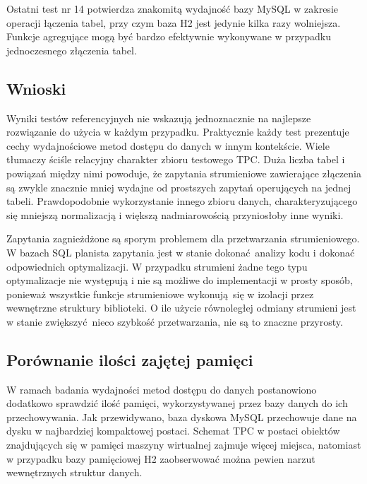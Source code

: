 \documentclass[12pt,twoside,openright]{extarticle}
\begin{document}
    Ostatni test nr 14 potwierdza znakomitą wydajność bazy MySQL w zakresie operacji łączenia tabel, przy czym baza H2 jest jedynie kilka razy wolniejsza. Funkcje agregujące mogą być bardzo efektywnie wykonywane w przypadku jednoczesnego złączenia tabel.

\subsection{Wnioski}

    Wyniki testów referencyjnych nie wskazują jednoznacznie na najlepsze rozwiązanie do użycia w każdym przypadku. Praktycznie każdy test prezentuje cechy wydajnościowe metod dostępu do danych w innym kontekście. Wiele tłumaczy ściśle relacyjny charakter zbioru testowego TPC. Duża liczba tabel i powiązań między nimi powoduje, że zapytania strumieniowe zawierające złączenia są zwykle znacznie mniej wydajne od prostszych zapytań operujących na jednej tabeli. Prawdopodobnie wykorzystanie innego zbioru danych, charakteryzującego się mniejszą normalizacją i większą nadmiarowością przyniosłoby inne wyniki. 

    Zapytania zagnieżdżone są sporym problemem dla przetwarzania strumieniowego. W bazach SQL planista zapytania jest w stanie dokonać analizy kodu i dokonać odpowiednich optymalizacji. W przypadku strumieni żadne tego typu optymalizacje nie występują i nie są możliwe do implementacji w prosty sposób, ponieważ wszystkie funkcje strumieniowe wykonują się w izolacji przez wewnętrzne struktury biblioteki. O ile użycie równoległej odmiany strumieni jest w stanie zwiększyć nieco szybkość przetwarzania, nie są to znaczne przyrosty.


\subsection{Porównanie ilości zajętej pamięci}

    W ramach badania wydajności metod dostępu do danych postanowiono dodatkowo sprawdzić ilość pamięci, wykorzystywanej przez bazy danych do ich przechowywania. Jak przewidywano, baza dyskowa MySQL przechowuje dane na dysku w najbardziej kompaktowej postaci. Schemat TPC w postaci obiektów znajdujących się w pamięci maszyny wirtualnej zajmuje więcej miejsca, natomiast w przypadku bazy pamięciowej H2 zaobserwować można pewien narzut wewnętrznych struktur danych.
\end{document}
